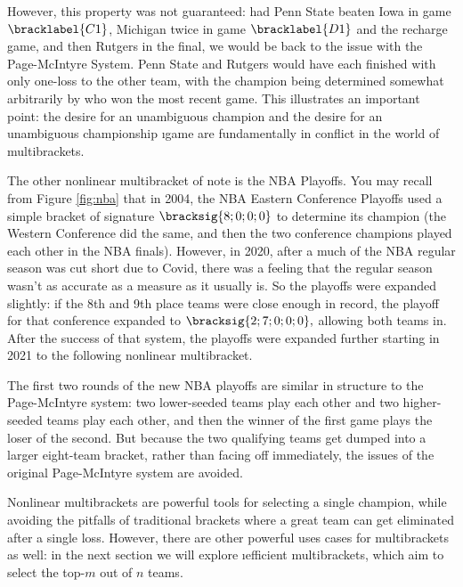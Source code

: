{    However, this property was not guaranteed: had Penn State beaten Iowa in game $\bracklabel{C1}$, Michigan twice in game $\bracklabel{D1}$ and the recharge game, and then Rutgers in the final, we would be back to the issue with the Page-McIntyre System. Penn State and Rutgers would have each finished with only one-loss to the other team, with the champion being determined somewhat arbitrarily by who won the most recent game. This illustrates an important point: the desire for an unambiguous champion and the desire for an unambiguous championship \i{game} are fundamentally in conflict in the world of multibrackets.

    The other nonlinear multibracket of note is the NBA Playoffs. You may recall from Figure \ref{fig:nba} that in 2004, the NBA Eastern Conference Playoffs used a simple bracket of signature $\bracksig{8;0;0;0}$ to determine its champion (the Western Conference did the same, and then the two conference champions played each other in the NBA finals). However, in 2020, after a much of the NBA regular season was cut short due to Covid, there was a feeling that the regular season wasn't as accurate as a measure as it usually is. So the playoffs were expanded slightly: if the 8th and 9th place teams were close enough in record, the playoff for that conference expanded to $\bracksig{2;7;0;0;0},$ allowing both teams in. After the success of that system, the playoffs were expanded further starting in 2021 to the following nonlinear multibracket.
    

    The first two rounds of the new NBA playoffs are similar in structure to the Page-McIntyre system: two lower-seeded teams play each other and two higher-seeded teams play each other, and then the winner of the first game plays the loser of the second. But because the two qualifying teams get dumped into a larger eight-team bracket, rather than facing off immediately, the issues of the original Page-McIntyre system are avoided.

    Nonlinear multibrackets are powerful tools for selecting a single champion, while avoiding the pitfalls of traditional brackets where a great team can get eliminated after a single loss. However, there are other powerful uses cases for multibrackets as well: in the next section we will explore \i{efficient} multibrackets, which aim to select the top-$m$ out of $n$ teams.
}
